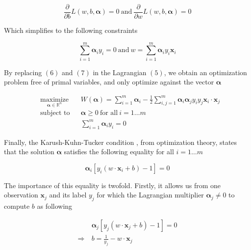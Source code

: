 \begin{equation}
  \frac{\partial}{\partial b}L(w, b, \boldsymbol{\alpha}) = 0
  \ \text{and}\ 
  \frac{\partial}{\partial w}L(w, b, \boldsymbol{\alpha}) = 0
\end{equation}

Which simplifies to the following constraints 

\begin{equation}
  \sum^m_{i=1} \boldsymbol{\alpha}_iy_i = 0
  \ \text{and}\ 
  w = \sum^m_{i=1} \boldsymbol{\alpha}_iy_i\mathbf{x}_i
\end{equation}

By replacing $(6)$ and $(7)$ in the Lagrangian $(5)$, we obtain an optimization problem free of primal variables, and only optimize against the vector $\boldsymbol{\alpha}$

\begin{equation}
  \begin{aligned}
    &\underset{\boldsymbol{\alpha} \in \mathbb{R}^n} {\text{maximize}}
    & & W(\boldsymbol{\alpha}) = \sum_{i=1}^m\boldsymbol{\alpha}_i - \frac{1}{2}\sum_{i,j=1}^m\boldsymbol{\alpha}_i\boldsymbol{\alpha}_jy_iy_j\mathbf{x}_i \cdot \mathbf{x}_j\\
    &\text{subject to}
    & &\boldsymbol{\alpha} \ge 0\ \text{for all}\ i = 1 \dotsc m\\
    & & &\sum^m_{i=1} \boldsymbol{\alpha}_iy_i = 0
  \end{aligned}
\end{equation}

Finally, the Karush-Kuhn-Tucker condition \cite{kuhn1951}, from optimization theory, states that the solution $\boldsymbol{\alpha}$ satisfies the following equality for all $i = 1\dotsc m$

\begin{equation}
  \boldsymbol{\alpha}_i[y_i(w \cdot \mathbf{x}_i + b) - 1] = 0
\end{equation}

The importance of this equality is twofold. Firstly, it allows us from one observation $\mathbf{x}_j$ and its label $y_j$ for which the Lagrangian multiplier $\boldsymbol{\alpha}_j \neq 0$ to compute $b$ as following

\begin{equation}
  \begin{aligned}
    &\boldsymbol{\alpha}_j[y_j(w \cdot \mathbf{x}_j + b) - 1] = 0\\
    \Rightarrow\ &b = \frac{1}{y_j} - w \cdot \mathbf{x}_j
  \end{aligned}
\end{equation}

